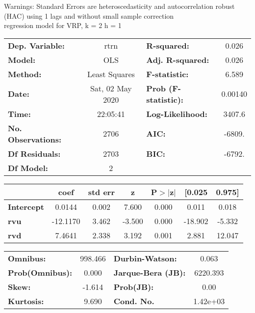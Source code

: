 Warnings: \newline
 [1] Standard Errors are heteroscedasticity and autocorrelation robust (HAC) using 1 lags and without small sample correction\\ 

regression model for VRP, k = 2 h = 1\begin{center}
\begin{tabular}{lclc}
\toprule
\textbf{Dep. Variable:}    &       rtrn       & \textbf{  R-squared:         } &     0.026   \\
\textbf{Model:}            &       OLS        & \textbf{  Adj. R-squared:    } &     0.026   \\
\textbf{Method:}           &  Least Squares   & \textbf{  F-statistic:       } &     6.589   \\
\textbf{Date:}             & Sat, 02 May 2020 & \textbf{  Prob (F-statistic):} &  0.00140    \\
\textbf{Time:}             &     22:05:41     & \textbf{  Log-Likelihood:    } &    3407.6   \\
\textbf{No. Observations:} &        2706      & \textbf{  AIC:               } &    -6809.   \\
\textbf{Df Residuals:}     &        2703      & \textbf{  BIC:               } &    -6792.   \\
\textbf{Df Model:}         &           2      & \textbf{                     } &             \\
\bottomrule
\end{tabular}
\begin{tabular}{lcccccc}
                   & \textbf{coef} & \textbf{std err} & \textbf{z} & \textbf{P$> |$z$|$} & \textbf{[0.025} & \textbf{0.975]}  \\
\midrule
\textbf{Intercept} &       0.0144  &        0.002     &     7.600  &         0.000        &        0.011    &        0.018     \\
\textbf{rvu}       &     -12.1170  &        3.462     &    -3.500  &         0.000        &      -18.902    &       -5.332     \\
\textbf{rvd}       &       7.4641  &        2.338     &     3.192  &         0.001        &        2.881    &       12.047     \\
\bottomrule
\end{tabular}
\begin{tabular}{lclc}
\textbf{Omnibus:}       & 998.466 & \textbf{  Durbin-Watson:     } &    0.063  \\
\textbf{Prob(Omnibus):} &   0.000 & \textbf{  Jarque-Bera (JB):  } & 6220.393  \\
\textbf{Skew:}          &  -1.614 & \textbf{  Prob(JB):          } &     0.00  \\
\textbf{Kurtosis:}      &   9.690 & \textbf{  Cond. No.          } & 1.42e+03  \\
\bottomrule
\end{tabular}
\end{center}

